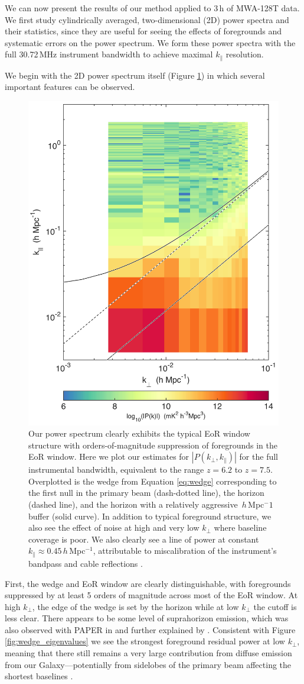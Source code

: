 We can now present the results of our method applied to 3\,h of MWA-128T data. We first study cylindrically averaged, two-dimensional (2D) power spectra and their statistics, since they are useful for seeing the effects of foregrounds and systematic errors on the power spectrum. We form these power spectra with the full 30.72\,MHz instrument bandwidth to achieve maximal $k_\|$ resolution.

We begin with the 2D power spectrum itself (Figure \ref{fig:2dPk}) in which several important features can be observed.
\begin{figure}[] 
	\centering 
	\includegraphics[width=.48\textwidth]{chap4_empirical_covariance/2dPk.png}
	\caption[Power spectrum results, exhibiting typical EoR window structure with orders-of-magnitude suppression of foregrounds in the EoR window.]{Our power spectrum clearly exhibits the typical EoR window structure with orders-of-magnitude suppression of foregrounds in the EoR window. Here we plot our estimates for $|P(k_\perp,k_\|)|$ for the full instrumental bandwidth, equivalent to the range $z=6.2$ to $z=7.5$. Overplotted is the wedge from Equation \ref{eq:wedge} corresponding to the first null in the primary beam (dash-dotted line), the horizon (dashed line), and the horizon with a relatively aggressive \wedgeBuffer\,$h$\,Mpc$^-1$ buffer (solid curve). In addition to typical foreground structure, we also see the effect of noise at high and very low $k_\perp$ where baseline coverage is poor. We also clearly see a line of power at constant $k_\| \approx 0.45$\,$h$\,Mpc$^{-1}$, attributable to miscalibration of the instrument's bandpass and cable reflections \citep{HazeltonEppsilon}.}
	\label{fig:2dPk}
\end{figure}  
First, the wedge and EoR window are clearly distinguishable, with foregrounds suppressed by at least 5 orders of magnitude across most of the EoR window. At high $k_\perp$, the edge of the wedge is set by the horizon while at low $k_\perp$ the cutoff is less clear. There appears to be some level of suprahorizon emission, which was also observed with PAPER in \citet{pober13} and further explained by \citet{AdrianWedge1}. Consistent with Figure \ref{fig:wedge_eigenvalues} we see the strongest foreground residual power at low $k_\perp$, meaning that there still remains a very large contribution from diffuse emission from our Galaxy---potentially from sidelobes of the primary beam affecting the shortest baselines \citep{nithya15,nithya15b}.


